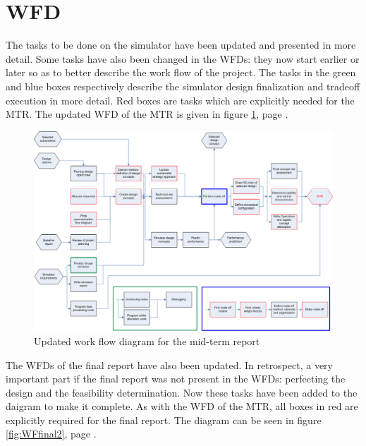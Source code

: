 \section{\acl{WFD}}
\label{WFD}
The tasks to be done on the simulator have been updated and presented in more detail. Some tasks have also been 
changed in the \acp{WFD}: they now start earlier or later so as to better describe the work flow of the project. 
The tasks in the green and blue boxes respectively describe the simulator design finalization and tradeoff execution in more detail. Red boxes are tasks which are explicitly needed for the \ac{MTR}. The updated \ac{WFD} of the \ac{MTR} is given in figure \ref{fig:WFmidterm2}, page \pageref{fig:WFmidterm2}.

\begin{figure}
\centering
\includegraphics[width=\textheight, angle=90]{chapters/img/Workflow_diagram_MTR_v2.png}
\caption{Updated work flow diagram for the mid-term report}
\label{fig:WFmidterm2}
\end{figure}

The \acp{WFD} of the final report have also been updated. In retrospect, a very important part if the final report was not 
present in the \acp{WFD}: perfecting the design and the feasibility determination. Now these tasks have been added
to the daigram to make it complete. As with the \ac{WFD} of the \ac{MTR}, all boxes in red are explicitly required
for the final report. The diagram can be seen in figure \ref{fig:WFfinal2}, page \pageref{fig:WFfinal2}.

